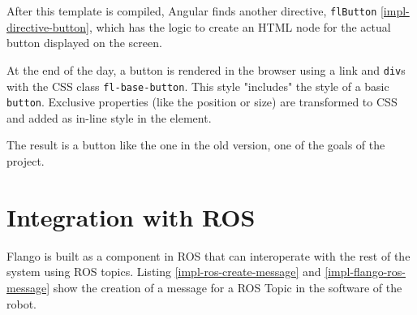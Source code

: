 After this template is compiled, Angular finds another directive, \texttt{flButton} \ref{impl-directive-button}, which has the logic to create an \ac{HTML} node for the actual button displayed on the screen.



At the end of the day, a button is rendered in the browser using a link and \texttt{div}s with the \ac{CSS} class \texttt{fl-base-button}.
This style "includes" the style of a basic \texttt{button}.
Exclusive properties (like the position or size) are transformed to \ac{CSS} and added as in-line style in the element.

The result is a button like the one in the old version, one of the goals of the project.


\section{Integration with ROS}
Flango \cm is built as a component in \ac{ROS} that can interoperate with the rest of the system using \ac{ROS} topics.
Listing \ref{impl-ros-create-message} and \ref{impl-flango-ros-message} show the creation of a message for a ROS Topic in the software of the robot.

